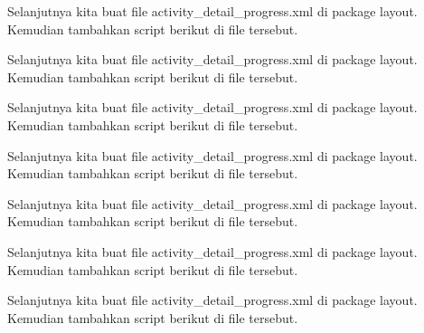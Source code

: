 

Selanjutnya kita buat file activity\_detail\_progress.xml di package layout. Kemudian tambahkan script berikut di file tersebut.





Selanjutnya kita buat file activity\_detail\_progress.xml di package layout. Kemudian tambahkan script berikut di file tersebut.





Selanjutnya kita buat file activity\_detail\_progress.xml di package layout. Kemudian tambahkan script berikut di file tersebut.





Selanjutnya kita buat file activity\_detail\_progress.xml di package layout. Kemudian tambahkan script berikut di file tersebut.





Selanjutnya kita buat file activity\_detail\_progress.xml di package layout. Kemudian tambahkan script berikut di file tersebut.





Selanjutnya kita buat file activity\_detail\_progress.xml di package layout. Kemudian tambahkan script berikut di file tersebut.





Selanjutnya kita buat file activity\_detail\_progress.xml di package layout. Kemudian tambahkan script berikut di file tersebut.



